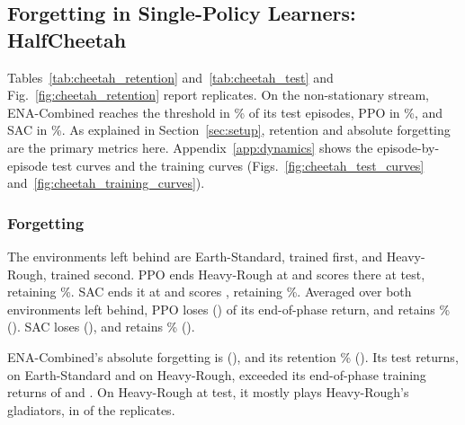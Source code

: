 

\subsection{Forgetting in Single-Policy Learners: HalfCheetah}
\label{sec:cheetah}
Tables~\ref{tab:cheetah_retention} and~\ref{tab:cheetah_test} and Fig.~\ref{fig:cheetah_retention} report  replicates. On the non-stationary stream, ENA-Combined reaches the  threshold in \% of its test episodes, PPO in \%, and SAC in \%. As explained in Section~\ref{sec:setup}, retention and absolute forgetting are the primary metrics here. Appendix~\ref{app:dynamics} shows the episode-by-episode test curves and the training curves (Figs.~\ref{fig:cheetah_test_curves} and~\ref{fig:cheetah_training_curves}).




\subsubsection{Forgetting}
The environments left behind are Earth-Standard, trained first, and Heavy-Rough, trained second. PPO ends Heavy-Rough at  and scores  there at test, retaining \%. SAC ends it at  and scores , retaining \%. Averaged over both environments left behind, PPO loses  () of its end-of-phase return, and retains \% (). SAC loses  (), and retains \% ().

ENA-Combined's absolute forgetting is  (), and its retention \% (). Its test returns,  on Earth-Standard and  on Heavy-Rough, exceeded its end-of-phase training returns of  and . On Heavy-Rough at test, it mostly plays Heavy-Rough's gladiators, in  of the  replicates.

